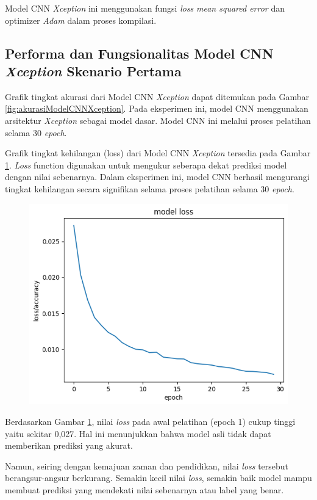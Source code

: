 Model CNN \textit{Xception} ini menggunakan fungsi \textit{loss} \textit{mean squared error} dan optimizer \textit{Adam} dalam proses kompilasi.

\subsection*{Performa dan Fungsionalitas Model CNN \textit{Xception} Skenario Pertama}

Grafik tingkat akurasi dari Model CNN \textit{Xception} dapat ditemukan pada Gambar \ref{fig:akurasiModelCNNXception}. Pada eksperimen ini, model CNN menggunakan arsitektur \textit{Xception} sebagai model dasar. Model CNN ini melalui proses pelatihan selama 30\textit{ epoch}.

Grafik tingkat kehilangan (loss) dari Model CNN \textit{Xception} tersedia pada Gambar \ref{fig:lossModelCNNXception}. \textit{Loss} function digunakan untuk mengukur seberapa dekat prediksi model dengan nilai sebenarnya. Dalam eksperimen ini, model CNN berhasil mengurangi tingkat kehilangan secara signifikan selama proses pelatihan selama 30\textit{ epoch}.

\begin{figure}[!hbt]
	\centering
	\includegraphics[width=0.7\linewidth]{gambar/bener/Loss_ModelXception.png}
	\label{fig:lossModelCNNXception}
\end{figure}

Berdasarkan Gambar \ref{fig:lossModelCNNXception}, nilai \textit{loss} pada awal pelatihan (epoch 1) cukup tinggi yaitu sekitar 0,027. Hal ini menunjukkan bahwa model asli tidak dapat memberikan prediksi yang akurat.

Namun, seiring dengan kemajuan zaman dan pendidikan, nilai \textit{loss} tersebut berangsur-angsur berkurang. Semakin kecil nilai \textit{loss}, semakin baik model mampu membuat prediksi yang mendekati nilai sebenarnya atau label yang benar.

